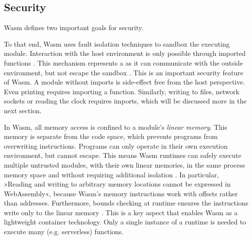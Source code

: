 \subsection{Security}

Wasm defines two important goals for security.

\begin{quote}
\end{quote}

To that end, Wasm uses fault isolation techniques to sandbox the executing module. Interaction with the host environment is only possible through imported functions \cite{W3C2020}. This mechanism represents a  as it can communicate with the outside environment, but not escape the sandbox \cite{Haas2017}. This is an important security feature of Wasm. A module without imports is side-effect free from the host perspective. Even printing  requires importing a  function. Similarly, writing to files, network sockets or reading the clock requires imports, which will be discussed more in the next section.

In Wasm, all memory access is confined to a module's \emph{linear memory}. This memory is separate from the code space, which prevents programs from overwriting instructions. Programs can only operate in their own execution environment, but cannot escape. This means Wasm runtimes can safely execute multiple untrusted modules, with their own linear memories, in the same process memory space and without requiring additional isolation \cite{Haas2017}. In particular, »Reading and writing to arbitrary memory locations cannot be expressed in WebAssembly«, because Wasm's memory instructions work with offsets rather than addresses. Furthermore, bounds checking at runtime ensures the instructions write only to the linear memory \cite{Denis2019}.
This is a key aspect that enables Wasm as a lightweight container technology. Only a single instance of a runtime is needed to execute many (e.g. serverless) functions.


